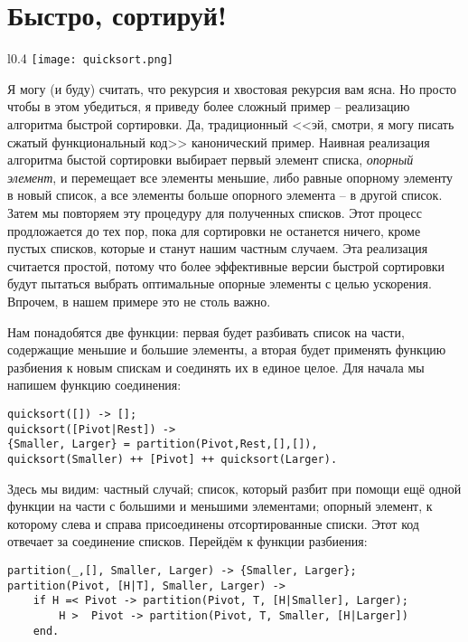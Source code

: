 \section{Быстро, сортируй!}
\label{quick-sort}
\begin{wrapfigure}{l}{0.4\linewidth}
    \texttt{[image: quicksort.png]}
\end{wrapfigure}
Я могу (и буду) считать, что рекурсия и хвостовая рекурсия вам ясна.
Но просто чтобы в этом убедиться, я приведу более сложный пример \--- реализацию алгоритма быстрой сортировки.
Да, традиционный <<эй, смотри, я могу писать сжатый функциональный код>> канонический пример.
Наивная реализация алгоритма быстой сортировки выбирает первый элемент списка, \emph{опорный элемент}, и перемещает все элементы меньшие, либо равные опорному элементу в новый список, а все элементы больше опорного элемента \--- в другой список.
Затем мы повторяем эту процедуру для полученных списков.
Этот процесс продложается до тех пор, пока для сортировки не останется ничего, кроме пустых списков, которые и станут нашим частным случаем.
Эта реализация считается простой, потому что более эффективные версии быстрой сортировки будут пытаться выбрать оптимальные опорные элементы с целью ускорения.
Впрочем, в нашем примере это не столь важно.

Нам понадобятся две функции: первая будет разбивать список на части, содержащие меньшие и большие элементы, а вторая будет применять функцию разбиения к новым спискам и соединять их в единое целое.
Для начала мы напишем функцию соединения:
\begin{lstlisting}[style=erlang]
quicksort([]) -> [];
quicksort([Pivot|Rest]) ->
{Smaller, Larger} = partition(Pivot,Rest,[],[]),
quicksort(Smaller) ++ [Pivot] ++ quicksort(Larger).
\end{lstlisting}

Здесь мы видим: частный случай; список, который разбит при помощи ещё одной функции на части с большими и меньшими элементами; опорный элемент, к которому слева и справа присоединены отсортированные списки.
Этот код отвечает за соединение списков.
Перейдём к функции разбиения:
\begin{lstlisting}[style=erlang]
partition(_,[], Smaller, Larger) -> {Smaller, Larger};
partition(Pivot, [H|T], Smaller, Larger) ->
    if H =< Pivot -> partition(Pivot, T, [H|Smaller], Larger);
        H >  Pivot -> partition(Pivot, T, Smaller, [H|Larger])
    end.
\end{lstlisting}


